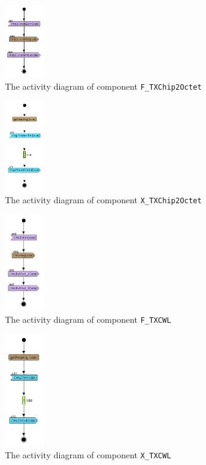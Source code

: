 \documentclass{llncs}
\begin{document}
%
\begin{figure}[!htbp]
	\centering
	\includegraphics[width=0.15\textwidth]{figures/screenshot/F_Chip2Octet.png}
	\caption{The activity diagram of component \texttt{F\_TXChip2Octet}}
	\label{fig:FChip2Octet}
\end{figure}
%
\begin{figure}[!htbp]
	\centering
	\includegraphics[width=0.15\textwidth]{figures/screenshot/X_Chip2Octet.png}
	\caption{The activity diagram of component \texttt{X\_TXChip2Octet}}
	\label{fig:XChip2Octet}
\end{figure}
%
\begin{figure}[!htbp]
	\centering
	\includegraphics[width=0.15\textwidth]{figures/screenshot/F_CWL.png}
	\caption{The activity diagram of component \texttt{F\_TXCWL}}
	\label{fig:FCWL}
\end{figure}
%
\begin{figure}[!htbp]
	\centering
	\includegraphics[width=0.15\textwidth]{figures/screenshot/X_CWL.png}
	\caption{The activity diagram of component \texttt{X\_TXCWL}}
	\label{fig:XCWL}
\end{figure}
\end{document}
